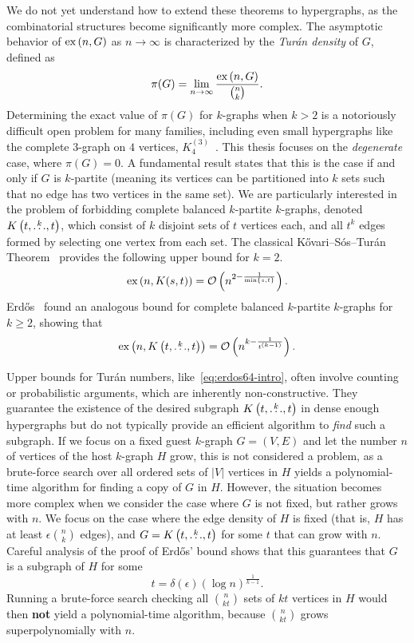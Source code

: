 We do not yet understand how to extend these theorems to hypergraphs,
as the combinatorial structures become significantly more complex.
The asymptotic behavior of $\text{ex} \left( n, G \right)$ as $n \to \infty$
is characterized by the \emph{Turán density} of $G$, defined as
\[
    \pi(G) = \lim_{n \to \infty} \frac{\text{ex} \left( n, G \right)}{\binom{n}{k}}.
\]
Determining the exact value of $\pi(G)$ for $k$-graphs when $k > 2$
is a notoriously difficult open problem for many families,
including even small hypergraphs like the complete $3$-graph on $4$ vertices,
$K_4^{(3)}$~\cite{keevash2011hypergraph, razborov20103}.
This thesis focuses on the \emph{degenerate} case, where $\pi(G) = 0$.
A fundamental result states that this is the case if and only if $G$ is $k$-partite
(meaning its vertices can be partitioned into $k$ sets such that no edge has two vertices in the same set).
We are particularly interested in the problem of forbidding complete balanced $k$-partite $k$-graphs,
denoted $K\left(t, \overset{k}{\dots}, t\right)$, which consist of $k$ disjoint sets of $t$ vertices each,
and all $t^k$ edges formed by selecting one vertex from each set.
The classical Kővari--Sós--Turán Theorem~\cite{Kovari1954, Hylten1958}
provides the following upper bound for $k=2$.
\[
    \text{ex} \left( n, K(s, t) \right) = \mathcal{O}\left(n^{2 - \frac{1}{\min\{s, t\}}}\right).
\]
Erdős~\cite{Erods1964} found an analogous bound for complete balanced $k$-partite $k$-graphs for $k \ge 2$,
showing that
\begin{equation} \label{eq:erdos64-intro}
    \text{ex} \left( n, K\left(t, \overset{k}{\dots}, t\right) \right) = \mathcal{O}\left(n^{k - \frac{1}{t^{(k-1)}}}\right).
\end{equation}

Upper bounds for Turán numbers, like~\eqref{eq:erdos64-intro},
often involve counting or probabilistic arguments,
which are inherently non-constructive.
They guarantee the existence of the desired subgraph $K\left(t, \overset{k}{\dots}, t\right)$
in dense enough hypergraphs but do not typically provide an efficient algorithm to \emph{find} such a subgraph.
If we focus on a fixed guest $k$-graph $G = (V, E)$ and let the number $n$ of vertices of the host $k$-graph $H$ grow,
this is not considered a problem,
as a brute-force search over all ordered sets of $|V|$ vertices in $H$ yields a polynomial-time algorithm
for finding a copy of $G$ in $H$.
However, the situation becomes more complex when we consider the case where $G$ is not fixed, but rather grows with $n$.
We focus on the case where the edge density of $H$ is fixed (that is, $H$ has at least $\epsilon \binom{n}{k}$ edges),
and $G = K\left(t, \overset{k}{\dots}, t\right)$ for some $t$ that can grow with $n$.
Careful analysis of the proof of Erdős' bound shows that this guarantees that $G$ is a subgraph of $H$ for some
\begin{equation} \label{eq:t-lower-intro}
    t = \delta(\epsilon) (\log n)^{\frac{1}{k-1}}.
\end{equation}
Running a brute-force search checking all $\binom{n}{kt}$ sets of $kt$
vertices in $H$ would then \textbf{not} yield a polynomial-time algorithm,
because $\binom{n}{kt}$ grows superpolynomially with $n$.

